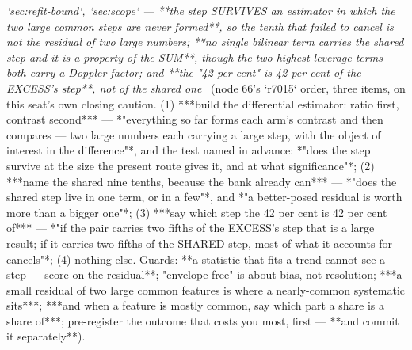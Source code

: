 \begin{description}
\textit{`sec:refit-bound`, `sec:scope` --- **the step SURVIVES an estimator in which the two large common steps are never formed**, so the tenth that failed to cancel is not the residual of two large numbers; **no single bilinear term carries the shared step and it is a property of the SUM**, though the two highest-leverage terms both carry a Doppler factor; and **the "42 per cent" is 42 per cent of the EXCESS's step**, not of the shared one} \ (node 66's `r7015` order, three items, on this seat's own closing caution. (1) ***build the differential estimator: ratio first, contrast second*** --- *"everything so far forms each arm's contrast and then compares --- two large numbers each carrying a large step, with the object of interest in the difference"*, and the test named in advance: *"does the step survive at the size the present route gives it, and at what significance"*; (2) ***name the shared nine tenths, because the bank already can*** --- *"does the shared step live in one term, or in a few"*, and *"a better-posed residual is worth more than a bigger one"*; (3) ***say which step the 42 per cent is 42 per cent of*** --- *"if the pair carries two fifths of the EXCESS's step that is a large result; if it carries two fifths of the SHARED step, most of what it accounts for cancels"*; (4) nothing else.  Guards: **a statistic that fits a trend cannot see a step --- score on the residual**; "envelope-free" is about bias, not resolution; ***a small residual of two large common features is where a nearly-common systematic sits***; ***and when a feature is mostly common, say which part a share is a share of***; pre-register the outcome that costs you most, first --- **and commit it separately**). 

\end{description}
